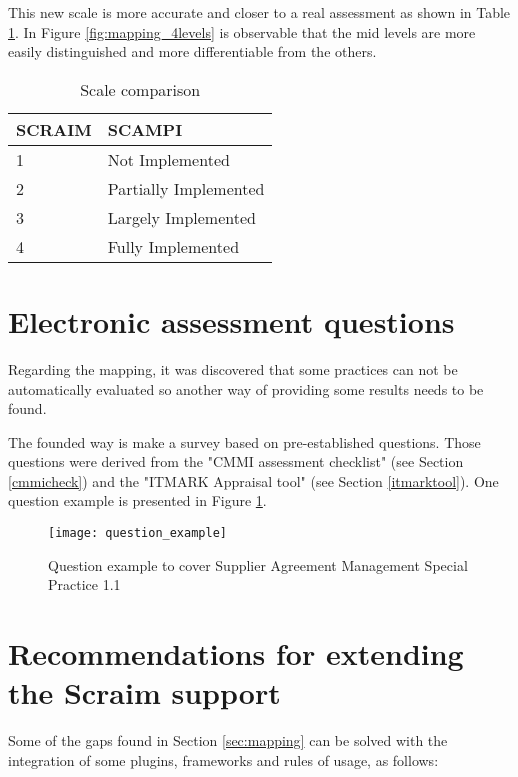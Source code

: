 This new scale is more accurate and closer to a real assessment as shown in Table \ref{tab:rules}. In Figure \ref{fig:mapping_4levels} is observable that the mid levels are more easily distinguished and more differentiable from the others.

\begin{table}[h]
	\centering
	\caption{Scale comparison}
	\begin{tabular}{|p{2cm}|p{4cm}|}
		\hline
		SCRAIM   & SCAMPI    \\
		\hline
		1 & Not Implemented\\
				\hline
				2 & Partially Implemented\\
				\hline
				3 & Largely Implemented\\
				\hline
				4 & Fully Implemented\\
				\hline
	\end{tabular}
	\label{tab:rules}
\end{table}

\section{Electronic assessment questions} \label{sec:question}

Regarding the mapping, it was discovered  that some practices can not be automatically evaluated so another way of providing some results needs to be found.

The founded way is make a survey based on pre-established questions. Those questions were derived from the "CMMI assessment checklist" (see Section \ref{cmmicheck}) and  the "ITMARK Appraisal tool" (see Section \ref{itmarktool}). One question example is presented in Figure \ref{fig:question_example}.

\begin{figure}[!htb]
	\begin{center}
		\leavevmode
		\texttt{[image: question\_example]}
		\caption{Question example to cover Supplier Agreement Management Special Practice 1.1}
		\label{fig:question_example}
	\end{center}
\end{figure}

\section{Recommendations for extending the Scraim support}

Some of the gaps found in Section \ref{sec:mapping} can be solved with the integration of some plugins, frameworks and rules of usage, as follows:

